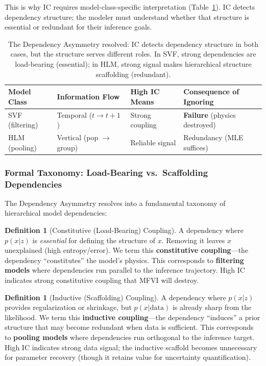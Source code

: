 \documentclass[10pt]{article} %
\theoremstyle{plain}
\theoremstyle{definition}
\newtheorem{definition}[theorem]{Definition}
\begin{document}
\noindent This is why IC requires model-class-specific interpretation (Table~\ref{tab:asymmetry}). IC detects dependency structure; the modeler must understand whether that structure is essential or redundant for their inference goals.

\begin{table}[!htbp]
\centering
\begin{tabular}{llll}
\toprule
Model Class & Information Flow & High IC Means & Consequence of Ignoring \\
\midrule
SVF (filtering) & Temporal ($t \to t+1$) & Strong coupling & \textbf{Failure} (physics destroyed) \\
HLM (pooling) & Vertical (pop $\to$ group) & Reliable signal & Redundancy (MLE suffices) \\
\bottomrule
\end{tabular}
\caption{The Dependency Asymmetry resolved: IC detects dependency structure in both cases, but the structure serves different roles. In SVF, strong dependencies are load-bearing (essential); in HLM, strong signal makes hierarchical structure scaffolding (redundant).}
\label{tab:asymmetry}
\end{table}

\subsubsection{Formal Taxonomy: Load-Bearing vs.\ Scaffolding Dependencies}

The Dependency Asymmetry resolves into a fundamental taxonomy of hierarchical model dependencies:

\begin{definition}[Constitutive (Load-Bearing) Coupling]
A dependency where $p(x|z)$ is \emph{essential} for defining the structure of $x$. Removing it leaves $x$ unexplained (high entropy/error). We term this \textbf{constitutive coupling}---the dependency ``constitutes'' the model's physics. This corresponds to \textbf{filtering models} where dependencies run parallel to the inference trajectory. High IC indicates strong constitutive coupling that MFVI will destroy.
\end{definition}

\begin{definition}[Inductive (Scaffolding) Coupling]
A dependency where $p(x|z)$ provides regularization or shrinkage, but $p(x|\text{data})$ is already sharp from the likelihood. We term this \textbf{inductive coupling}---the dependency ``induces'' a prior structure that may become redundant when data is sufficient. This corresponds to \textbf{pooling models} where dependencies run orthogonal to the inference target. High IC indicates strong data signal; the inductive scaffold becomes unnecessary for parameter recovery (though it retains value for uncertainty quantification).
\end{definition}
\end{document}
